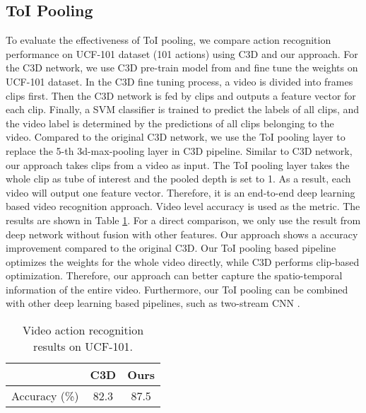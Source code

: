 \documentclass[10pt,twocolumn,letterpaper]{article}
\begin{document}
\subsection{ToI Pooling}
\label{subsec:toipool}
To evaluate the effectiveness of ToI pooling, we compare action recognition performance on UCF-101 dataset (101 actions) using C3D \cite{c3d} and our approach. For the C3D network, we use C3D pre-train model from \cite{c3d} and fine tune the weights on UCF-101 dataset. In the C3D fine tuning process, a video is divided into  frames clips first. Then the C3D network is fed by clips and outputs a feature vector for each clip. Finally, a SVM classifier is trained to predict the labels of all clips, and the video label is determined by the predictions of all clips belonging to the video. Compared to the original C3D network, we use the ToI pooling layer to replace the 5-th 3d-max-pooling layer in C3D pipeline.
Similar to C3D network, our approach takes clips from a video as input. The ToI pooling layer takes the whole clip as tube of interest and the pooled depth is set to 1. As a result, each video will output one feature vector. Therefore, it is an end-to-end deep learning based video recognition approach. Video level accuracy is used as the metric. The results are shown in Table \ref{tab:toi_eval}.
For a direct comparison, we only use the result from deep network without fusion with other features. Our approach shows a  accuracy improvement compared to the original C3D. Our ToI pooling based pipeline optimizes the weights for the whole video directly, while C3D performs clip-based optimization. Therefore, our approach can better capture the spatio-temporal information of the entire video. Furthermore, our ToI pooling can be combined with other deep learning based pipelines, such as two-stream CNN \cite{2stream_cnn_simonyan_2014two}.

\begin{table}[!h]
\small
\begin{center}
\begin{tabular}{lcc}
\hline
                & C3D \cite{c3d}    & Ours \\
\hline
Accuracy (\%)   & 82.3              & 87.5 \\
\hline

\end{tabular}
\caption{Video action recognition results on UCF-101.}
\label{tab:toi_eval}
\end{center}
\end{table}
\end{document}
